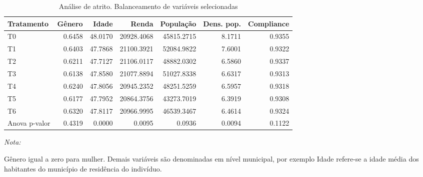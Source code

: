 \begin{table}[H]

\caption{\label{tab:atrito-bal}Análise de atrito. Balanceamento de variáveis selecionadas}
\centering
\begin{threeparttable}
\begin{tabular}[t]{lrrrrrr}
\toprule
Tratamento & Gênero & Idade & Renda & População & Dens. pop. & Compliance\\
\midrule
T0 & 0.6458 & 48.0170 & 20928.4068 & 45815.2715 & 8.1711 & 0.9355\\
T1 & 0.6403 & 47.7868 & 21100.3921 & 52084.9822 & 7.6001 & 0.9322\\
T2 & 0.6211 & 47.7127 & 21106.0117 & 48882.0302 & 6.5860 & 0.9337\\
T3 & 0.6138 & 47.8580 & 21077.8894 & 51027.8338 & 6.6317 & 0.9313\\
T4 & 0.6240 & 47.8056 & 20945.2352 & 48251.5259 & 6.5957 & 0.9318\\
\addlinespace
T5 & 0.6177 & 47.7952 & 20864.3756 & 43273.7019 & 6.3919 & 0.9308\\
T6 & 0.6320 & 47.8117 & 20966.9995 & 46539.3467 & 6.4614 & 0.9324\\
Anova p-valor & 0.4319 & 0.0000 & 0.0095 & 0.0936 & 0.0094 & 0.1122\\
\bottomrule
\end{tabular}
\begin{tablenotes}
\item \textit{Nota:} 
\item Gênero igual a zero para mulher. Demais variáveis são denominadas em nível municipal, por exemplo Idade refere-se a idade média dos habitantes do município de residência do indivíduo.
\end{tablenotes}
\end{threeparttable}
\end{table}
